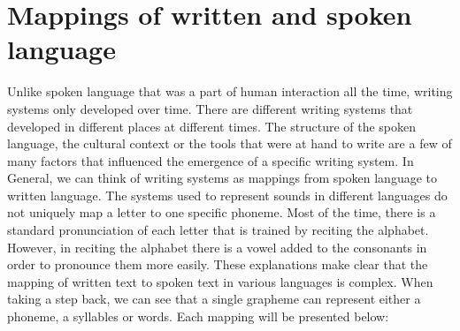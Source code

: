 \section{Mappings of written and spoken language}
\label{writing-sys}
Unlike spoken language that was a part of human interaction all the time, writing systems only developed over time. There are different writing systems that developed in different places at different times. The structure of the spoken language, the cultural context or the tools that were at hand to write are a few of many factors that influenced the emergence of a specific writing system. In General, we can think of writing systems as mappings from spoken language to written language. The systems used to represent sounds in different languages do not uniquely map a letter to one specific phoneme. Most of the time, there is a standard pronunciation of each letter that is trained by reciting the alphabet. However, in reciting the alphabet there is a vowel added to the consonants in order to pronounce them more easily. These explanations make clear that the mapping of written text to spoken text in various languages is complex. When taking a step back, we can see that a single grapheme can represent either a phoneme, a syllables or words. Each mapping will be presented below: 

